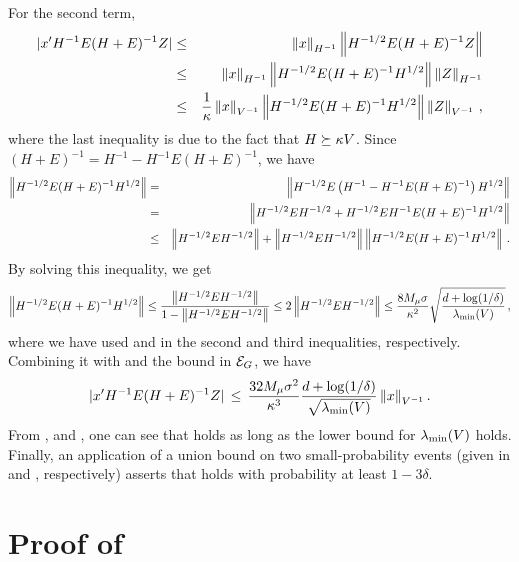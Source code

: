 For the second term, 
\begin{eqnarray}
 |x' H^{-1} E (H+E)^{-1} Z|  \nonumber &\le& \left\|x\right\| _{H^{-1}} \left\|H^{-1/2}E (H+E)^{-1} Z\right\| \\
 \nonumber &\le& \left\|x\right\|_{H^{-1}} \left\|H^{-1/2}E (H+E)^{-1}H^{1/2}\right\| \left\|Z\right\|_{H^{-1}} \\
 \label{eq:term2} &\le& \frac{1}{\kappa} \left\|x\right\|_{V^{-1}} \left\|H^{-1/2}E (H+E)^{-1}H^{1/2}\right\| \left\|Z\right\|_{V^{-1}}\,,
\end{eqnarray}
where the last inequality is due to the fact that $H \succeq \kappa V$. Since $(H+E)^{-1}=H^{-1}-H^{-1}E(H+E)^{-1}$, we have
\begin{eqnarray*}
\left\|H^{-1/2}E (H+E)^{-1}H^{1/2}\right\| &=& \left\|H^{-1/2}E \left(H^{-1} - H^{-1} E (H+E)^{-1}\right)H^{1/2}\right\| \\
&=& \left\|H^{-1/2} E H^{-1/2} + H^{-1/2} E H^{-1} E (H+E)^{-1} H^{1/2}\right\| \\
&\le& \left\|H^{-1/2} E H^{-1/2}\right\| + \left\|H^{-1/2} E H^{-1/2}\right\| \left\|H^{-1/2}E (H+E)^{-1}H^{1/2}\right\|\,.
\end{eqnarray*}
By solving this inequality, we get
\begin{equation*} \label{eq:matrixinv}
\left\|H^{-1/2}E (H+E)^{-1}H^{1/2}\right\| \le \frac{\left\|H^{-1/2} E H^{-1/2}\right\|}{1-\left\|H^{-1/2} E H^{-1/2}\right\|} \le 2 \left\|H^{-1/2} E H^{-1/2}\right\| \le \frac{8 M_\mu \sigma}{\kappa^2} \sqrt{\frac{d + \log(1/\delta)}{\lambda_{\min}(V)}}\,,
\end{equation*}
where we have used  and  in the second and third inequalities, respectively.
Combining it with  and the bound in $\mathcal{E}_G$, we have
\begin{equation} 
|x' H^{-1} E (H+E)^{-1} Z| \,\le\, \frac{32 M_\mu \sigma^2}{\kappa^3} \frac{d + \log(1/\delta)}{\sqrt{\lambda_{\min}(V)}} \left\|x\right\|_{V^{-1}}.
\label{eqn:second-term-bound}
\end{equation}
From ,  and , one can see that  holds as long as the lower bound  for $\lambda_{\min}(V)$ holds.  Finally, an application of a union bound on two small-probability events (given in  and , respectively) asserts that  holds with probability at least $1-3\delta$.

\section{Proof of }

